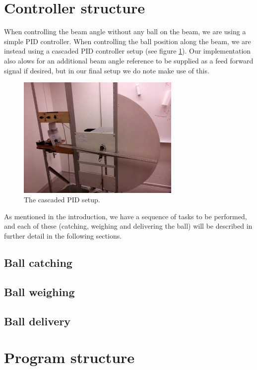 \documentclass{article}
\begin{document}
\section{Controller structure}
When controlling the beam angle without any ball on the beam, we are using a simple PID controller. When controlling the ball position along the beam, we are instead using a cascaded PID controller setup (see figure \ref{cascaded_pid_fig}). Our implementation also alows for an additional beam angle reference to be supplied as a feed forward signal if desired, but in our final setup we do note make use of this.
\begin{figure}
\centering
\includegraphics[width=0.7\textwidth]{figures/process_fig.jpg}
\caption{The cascaded PID setup.}\label{cascaded_pid_fig}
\end{figure}

As mentioned in the introduction, we have a sequence of tasks to be performed, and each of these (catching, weighing and delivering the ball) will be described in further detail in the following sections.

\subsection{Ball catching}


\subsection{Ball weighing}


\subsection{Ball delivery}


\section{Program structure}

\end{document}
